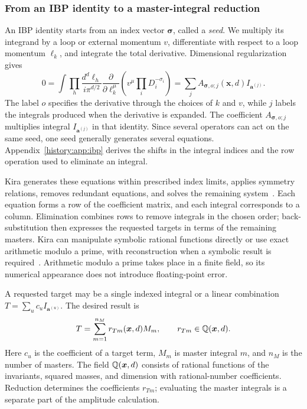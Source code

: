 \subsubsection{From an IBP identity to a master-integral reduction}
An IBP identity starts from an index vector $\boldsymbol\sigma$, called a \emph{seed}. We multiply its integrand by a loop or external momentum $v$, differentiate with respect to a loop momentum $\ell_k$, and integrate the total derivative. Dimensional regularization gives~\cite{ChetyrkinTkachov}
\begin{equation}
 0=\int\prod_h\frac{d^d\ell_h}{i\pi^{d/2}}
 \frac{\partial}{\partial\ell_k^\mu}
 \left(v^\mu\prod_iD_i^{-\sigma_i}\right)
 =\sum_j A_{\boldsymbol\sigma,o;j}(\boldsymbol x,d)
     I_{\boldsymbol a^{(j)}}.
 \label{history:eq:ibp}
\end{equation}
The label $o$ specifies the derivative through the choices of $k$ and $v$, while $j$ labels the integrals produced when the derivative is expanded. The coefficient $A_{\boldsymbol\sigma,o;j}$ multiplies integral $I_{\boldsymbol a^{(j)}}$ in that identity. Since several operators can act on the same seed, one seed generally generates several equations. Appendix~\ref{history:app:ibp} derives the shifts in the integral indices and the row operation used to eliminate an integral.

Kira generates these equations within prescribed index limits, applies symmetry relations, removes redundant equations, and solves the remaining system~\cite{KiraOriginal,Kira3}. Each equation forms a row of the coefficient matrix, and each integral corresponds to a column. Elimination combines rows to remove integrals in the chosen order; back-substitution then expresses the requested targets in terms of the remaining masters. Kira can manipulate symbolic rational functions directly or use exact arithmetic modulo a prime, with reconstruction when a symbolic result is required~\cite{KiraOriginal,Kira2}. Arithmetic modulo a prime takes place in a finite field, so its numerical appearance does not introduce floating-point error.

A requested target may be a single indexed integral or a linear combination $T=\sum_u c_u I_{\boldsymbol a^{(u)}}$. The desired result is
\begin{equation}
 T=\sum_{m=1}^{n_M}r_{Tm}(\boldsymbol x,d)M_m,
 \qquad r_{Tm}\in\mathbb Q(\boldsymbol x,d).
 \label{history:eq:master}
\end{equation}
Here $c_u$ is the coefficient of a target term, $M_m$ is master integral $m$, and $n_M$ is the number of masters. The field $\mathbb Q(\boldsymbol x,d)$ consists of rational functions of the invariants, squared masses, and dimension with rational-number coefficients. Reduction determines the coefficients $r_{Tm}$; evaluating the master integrals is a separate part of the amplitude calculation.

